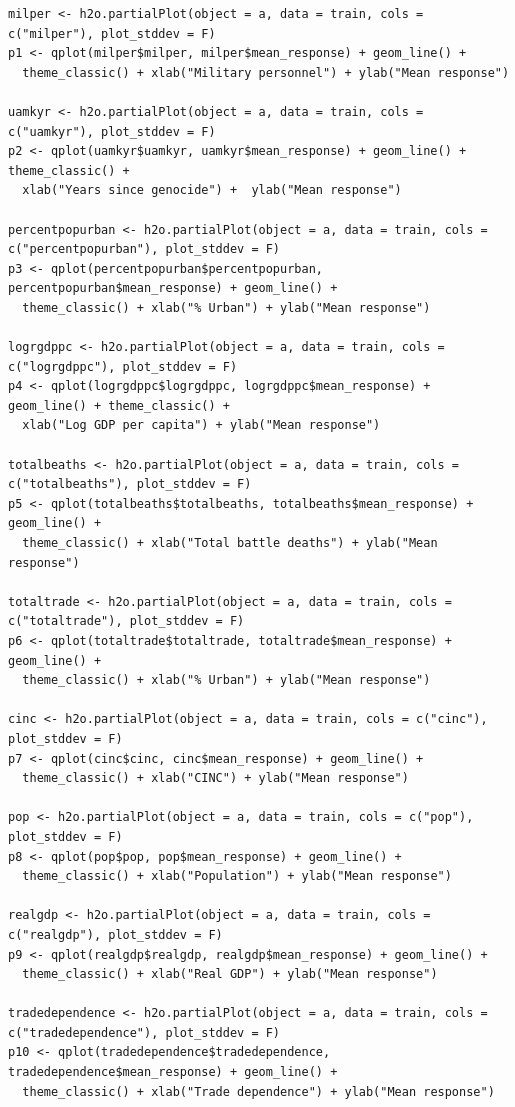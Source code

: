 \begin{verbatim}
milper <- h2o.partialPlot(object = a, data = train, cols = c("milper"), plot_stddev = F)
p1 <- qplot(milper$milper, milper$mean_response) + geom_line() +
  theme_classic() + xlab("Military personnel") + ylab("Mean response")

uamkyr <- h2o.partialPlot(object = a, data = train, cols = c("uamkyr"), plot_stddev = F)
p2 <- qplot(uamkyr$uamkyr, uamkyr$mean_response) + geom_line() + theme_classic() + 
  xlab("Years since genocide") +  ylab("Mean response")

percentpopurban <- h2o.partialPlot(object = a, data = train, cols = c("percentpopurban"), plot_stddev = F)
p3 <- qplot(percentpopurban$percentpopurban, percentpopurban$mean_response) + geom_line() +
  theme_classic() + xlab("% Urban") + ylab("Mean response")

logrgdppc <- h2o.partialPlot(object = a, data = train, cols = c("logrgdppc"), plot_stddev = F)
p4 <- qplot(logrgdppc$logrgdppc, logrgdppc$mean_response) + geom_line() + theme_classic() +
  xlab("Log GDP per capita") + ylab("Mean response")

totalbeaths <- h2o.partialPlot(object = a, data = train, cols = c("totalbeaths"), plot_stddev = F)
p5 <- qplot(totalbeaths$totalbeaths, totalbeaths$mean_response) + geom_line() +
  theme_classic() + xlab("Total battle deaths") + ylab("Mean response")

totaltrade <- h2o.partialPlot(object = a, data = train, cols = c("totaltrade"), plot_stddev = F)
p6 <- qplot(totaltrade$totaltrade, totaltrade$mean_response) + geom_line() +
  theme_classic() + xlab("% Urban") + ylab("Mean response")

cinc <- h2o.partialPlot(object = a, data = train, cols = c("cinc"), plot_stddev = F)
p7 <- qplot(cinc$cinc, cinc$mean_response) + geom_line() +
  theme_classic() + xlab("CINC") + ylab("Mean response")

pop <- h2o.partialPlot(object = a, data = train, cols = c("pop"), plot_stddev = F)
p8 <- qplot(pop$pop, pop$mean_response) + geom_line() +
  theme_classic() + xlab("Population") + ylab("Mean response")

realgdp <- h2o.partialPlot(object = a, data = train, cols = c("realgdp"), plot_stddev = F)
p9 <- qplot(realgdp$realgdp, realgdp$mean_response) + geom_line() +
  theme_classic() + xlab("Real GDP") + ylab("Mean response")

tradedependence <- h2o.partialPlot(object = a, data = train, cols = c("tradedependence"), plot_stddev = F)
p10 <- qplot(tradedependence$tradedependence, tradedependence$mean_response) + geom_line() +
  theme_classic() + xlab("Trade dependence") + ylab("Mean response")


\end{verbatim}
